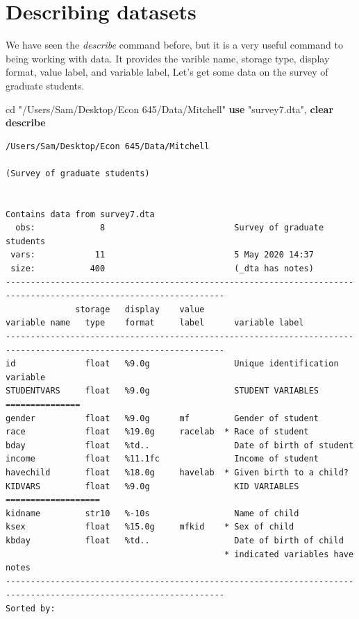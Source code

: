 \documentclass[
]{book}
\newenvironment{Shaded}{\begin{snugshade}}{\end{snugshade}}
\newcommand{\KeywordTok}[1]{\textcolor[rgb]{0.13,0.29,0.53}{\textbf{#1}}}
\newcommand{\NormalTok}[1]{#1}
\newcommand{\StringTok}[1]{\textcolor[rgb]{0.31,0.60,0.02}{#1}}
\begin{document}
\section{Describing datasets}\label{describing-datasets}

We have seen the \emph{describe} command before, but it is a very useful command to being working with data. It provides the varible name, storage type, display format, value label, and variable label, Let's get some data on the survey of graduate students.

\begin{Shaded}
\begin{Highlighting}[]
\NormalTok{cd }\StringTok{"/Users/Sam/Desktop/Econ 645/Data/Mitchell"}
\KeywordTok{use} \StringTok{"survey7.dta"}\NormalTok{, }\KeywordTok{clear}
\KeywordTok{describe}
\end{Highlighting}
\end{Shaded}

\begin{verbatim}
/Users/Sam/Desktop/Econ 645/Data/Mitchell

(Survey of graduate students)


Contains data from survey7.dta
  obs:             8                          Survey of graduate students
 vars:            11                          5 May 2020 14:37
 size:           400                          (_dta has notes)
------------------------------------------------------------------------------------------------------------------
              storage   display    value
variable name   type    format     label      variable label
------------------------------------------------------------------------------------------------------------------
id              float   %9.0g                 Unique identification variable
STUDENTVARS     float   %9.0g                 STUDENT VARIABLES ===============
gender          float   %9.0g      mf         Gender of student
race            float   %19.0g     racelab  * Race of student
bday            float   %td..                 Date of birth of student
income          float   %11.1fc               Income of student
havechild       float   %18.0g     havelab  * Given birth to a child?
KIDVARS         float   %9.0g                 KID VARIABLES ===================
kidname         str10   %-10s                 Name of child
ksex            float   %15.0g     mfkid    * Sex of child
kbday           float   %td..                 Date of birth of child
                                            * indicated variables have notes
------------------------------------------------------------------------------------------------------------------
Sorted by: 
\end{verbatim}
\end{document}

